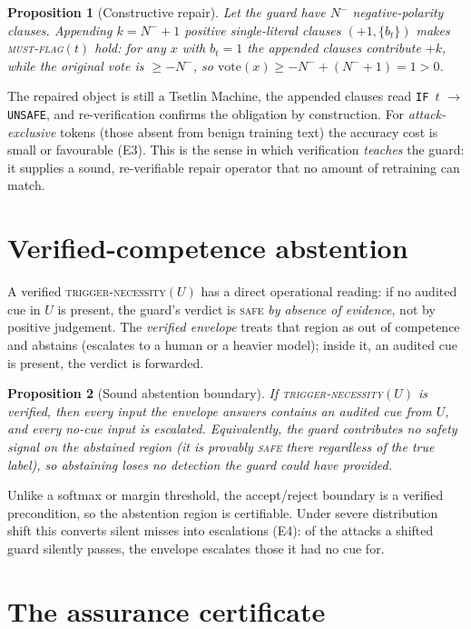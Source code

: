 \documentclass[11pt]{article}
\newtheorem{proposition}{Proposition}
\begin{document}
\begin{proposition}[Constructive repair]\label{prop:repair}
Let the guard have $N^- $ negative-polarity clauses. Appending $k=N^-+1$ positive
single-literal clauses $(+1,\{b_t\})$ makes \textsc{must-flag}$(t)$ hold: for any
$x$ with $b_t{=}1$ the appended clauses contribute $+k$, while the original vote is
$\ge -N^-$, so $\mathrm{vote}(x)\ge -N^- + (N^-+1) = 1 > 0$.
\end{proposition}
The repaired object is still a Tsetlin Machine, the appended clauses read
\texttt{IF $t$} $\rightarrow$ \texttt{UNSAFE}, and re-verification confirms the
obligation by construction. For \emph{attack-exclusive} tokens (those absent from
benign training text) the accuracy cost is small or favourable (E3). This is the
sense in which verification \emph{teaches} the guard: it supplies a sound,
re-verifiable repair operator that no amount of retraining can match.

\section{Verified-competence abstention}
\label{sec:envelope}

A verified \textsc{trigger-necessity}$(U)$ has a direct operational reading: if no
audited cue in $U$ is present, the guard's verdict is \textsc{safe} \emph{by absence
of evidence}, not by positive judgement. The \emph{verified envelope} treats that
region as out of competence and abstains (escalates to a human or a heavier model);
inside it, an audited cue is present, the verdict is forwarded.

\begin{proposition}[Sound abstention boundary]\label{prop:env}
If \textsc{trigger-necessity}$(U)$ is verified, then every input the envelope
answers contains an audited cue from $U$, and every no-cue input is escalated.
Equivalently, the guard contributes no safety signal on the abstained region (it is
provably \textsc{safe} there regardless of the true label), so abstaining loses no
detection the guard could have provided.
\end{proposition}
Unlike a softmax or margin threshold, the accept/reject boundary is a verified
precondition, so the abstention region is certifiable. Under severe distribution
shift this converts silent misses into escalations (E4): of the attacks a shifted
guard silently passes, the envelope escalates those it had no cue for.

\section{The assurance certificate}
\label{sec:cert}
\end{document}

